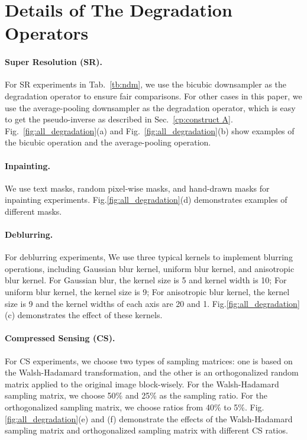 \documentclass{article} \usepackage{iclr2023_conference,times}
\begin{document}
\newpage

\section{Details of The Degradation Operators}

\paragraph{Super Resolution (SR).} For SR experiments in Tab.~\ref{tb:ndm}, we use the bicubic downsampler as the degradation operator to ensure fair comparisons. For other cases in this paper, we use the average-pooling downsampler as the degradation operator, which is easy to get the pseudo-inverse as described in Sec.~\ref{cp:construct A}. Fig.~\ref{fig:all_degradation}(a) and Fig.~\ref{fig:all_degradation}(b) show examples of the bicubic operation and the average-pooling operation.

\paragraph{Inpainting.} We use text masks, random pixel-wise masks, and hand-drawn masks for inpainting experiments. Fig.\ref{fig:all_degradation}(d) demonstrates examples of different masks.

\paragraph{Deblurring.} For deblurring experiments, We use three typical kernels to implement blurring operations, including Gaussian blur kernel, uniform blur kernel, and anisotropic blur kernel. For Gaussian blur, the kernel size is 5 and kernel width is 10; For uniform blur kernel, the kernel size is 9; For anisotropic blur kernel, the kernel size is 9 and the kernel widths of each axis are 20 and 1. Fig.\ref{fig:all_degradation}(c) demonstrates the effect of these kernels.

\paragraph{Compressed Sensing (CS).} For CS experiments, we choose two types of sampling matrices: one is based on the Walsh-Hadamard transformation, and the other is an orthogonalized random matrix applied to the original image block-wisely. For the Walsh-Hadamard sampling matrix, we choose 50\% and 25\% as the sampling ratio. For the orthogonalized sampling matrix, we choose ratios from 40\% to 5\%. Fig.\ref{fig:all_degradation}(e) and (f) demonstrate the effects of the Walsh-Hadamard sampling matrix and orthogonalized sampling matrix with different CS ratios.
\end{document}
